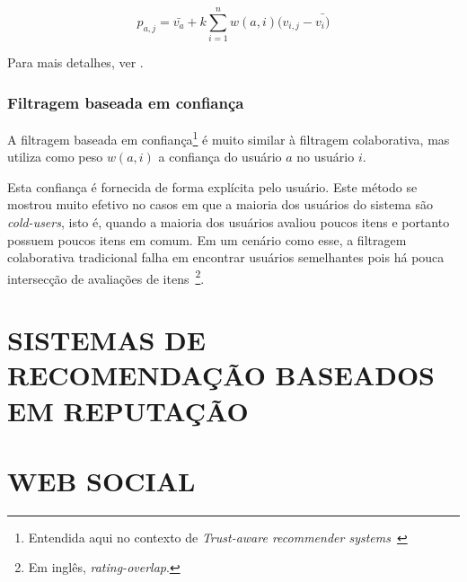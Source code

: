 \begin{equation}
 p_{a,j} = \bar{v_{a}} + k\sum_{i=1}^n{w(a,i) (v_{i,j} - \bar{v_{i})}}
 \label{eq:filtragem_colaborativa_geral} 
\end{equation}

Para mais detalhes, ver \cite{Breese98}.


\subsubsection{Filtragem baseada em confiança} %

A filtragem baseada em confiança\footnote{Entendida aqui no contexto de \textit{Trust-aware recommender systems}~\cite{Massa07}} é muito similar à filtragem colaborativa, mas utiliza como peso $w(a,i)$ a confiança do usuário $a$ no usuário $i$.

Esta confiança é fornecida de forma explícita pelo usuário. Este método se mostrou muito efetivo no casos em que a maioria dos usuários do sistema são \textit{cold-users}, isto é, quando a maioria dos usuários avaliou poucos itens e portanto possuem poucos itens em comum. Em um cenário como esse, a filtragem colaborativa tradicional falha em encontrar usuários semelhantes pois há pouca intersecção de avaliações de itens~\footnote{Em inglês, \textit{rating-overlap}.}.



\section{SISTEMAS DE RECOMENDAÇÃO BASEADOS EM REPUTAÇÃO}
\label{sec:sistemas_de_recomendacao_baseados_em_reputacao}




\section{WEB SOCIAL} %

